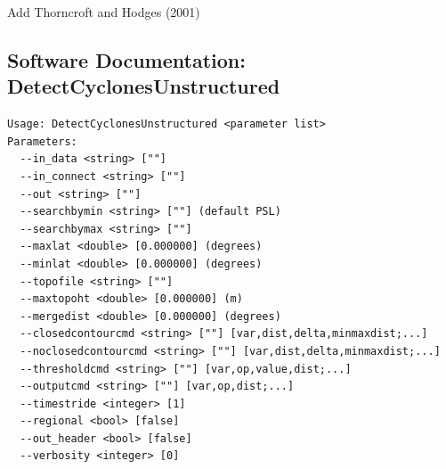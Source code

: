 \documentclass[gmdd, hvmath, online]{copernicus_discussions}
\begin{document}
{\color{red}Add Thorncroft and Hodges (2001)}

\subsection{Software Documentation: DetectCyclonesUnstructured} \label{sec:DetectCyclonesUnstructuredAppendix}

\begin{verbatim}
Usage: DetectCyclonesUnstructured <parameter list>
Parameters:
  --in_data <string> [""] 
  --in_connect <string> [""] 
  --out <string> [""] 
  --searchbymin <string> [""] (default PSL)
  --searchbymax <string> [""] 
  --maxlat <double> [0.000000] (degrees)
  --minlat <double> [0.000000] (degrees)
  --topofile <string> [""] 
  --maxtopoht <double> [0.000000] (m)
  --mergedist <double> [0.000000] (degrees)
  --closedcontourcmd <string> [""] [var,dist,delta,minmaxdist;...]
  --noclosedcontourcmd <string> [""] [var,dist,delta,minmaxdist;...]
  --thresholdcmd <string> [""] [var,op,value,dist;...]
  --outputcmd <string> [""] [var,op,dist;...]
  --timestride <integer> [1] 
  --regional <bool> [false] 
  --out_header <bool> [false] 
  --verbosity <integer> [0] 
\end{verbatim}
\end{document}
